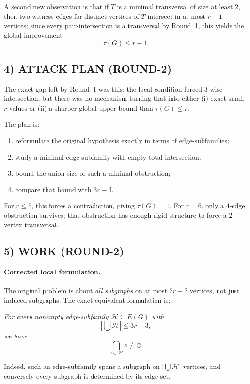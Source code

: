 A second new observation is that if $T$ is a minimal transversal of size at least $2$, then two witness edges for distinct vertices of $T$ intersect in at most $r-1$ vertices; since every pair-intersection is a transversal by Round~1, this yields the global improvement
\[
\tau(G)\le r-1.
\]

\subsection*{4) ATTACK PLAN (ROUND-2)}

The exact gap left by Round~1 was this: the local condition forced $3$-wise intersection, but there was no mechanism turning that into either (i) exact small-$r$ values or (ii) a sharper global upper bound than $\tau(G)\le r$.

The plan is:

\begin{enumerate}
\item reformulate the original hypothesis exactly in terms of edge-subfamilies;
\item study a minimal edge-subfamily with empty total intersection;
\item bound the union size of such a minimal obstruction;
\item compare that bound with $3r-3$.
\end{enumerate}

For $r\le 5$, this forces a contradiction, giving $\tau(G)=1$. For $r=6$, only a $4$-edge obstruction survives; that obstruction has enough rigid structure to force a $2$-vertex transversal.

\subsection*{5) WORK (ROUND-2)}

\paragraph{Corrected local formulation.}
The original problem is about \emph{all subgraphs} on at most $3r-3$ vertices, not just induced subgraphs. The exact equivalent formulation is:

\medskip
\noindent
\emph{For every nonempty edge-subfamily $\mathcal{H}\subseteq E(G)$ with}
\[
\left|\bigcup \mathcal{H}\right|\le 3r-3,
\]
\emph{we have}
\[
\bigcap_{e\in \mathcal{H}} e\neq \varnothing.
\]

Indeed, such an edge-subfamily spans a subgraph on $\left|\bigcup \mathcal{H}\right|$ vertices, and conversely every subgraph is determined by its edge set.

